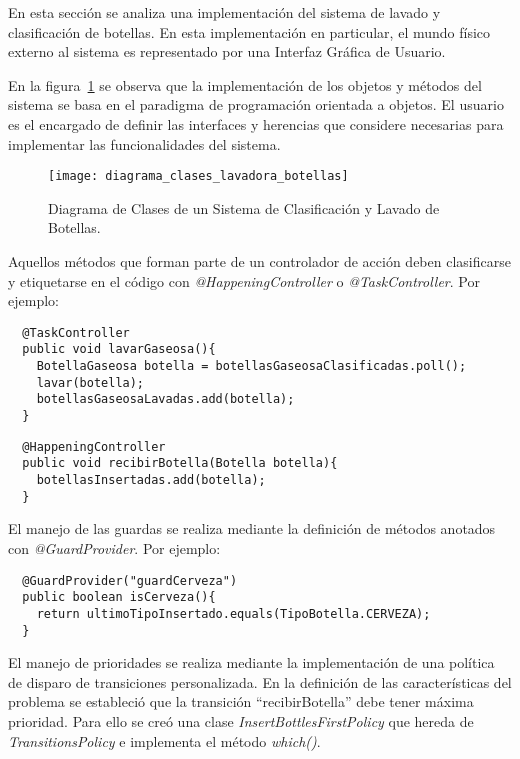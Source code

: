 En esta sección se analiza una implementación del sistema de
lavado y clasificación de botellas. En esta implementación en particular, el
mundo físico externo al sistema es representado por una Interfaz Gráfica de
Usuario. 

En la figura~\ref{fig:diagrama_clases_lavadora_botellas} se observa que la
implementación de los objetos y métodos del sistema se basa en el paradigma de
programación orientada a objetos. El usuario es el encargado de definir las
interfaces y herencias que considere necesarias para implementar las
funcionalidades del sistema.
\begin{figure}[H]
    \centering
    \texttt{[image: diagrama\_clases\_lavadora\_botellas]}
    \caption{Diagrama de Clases de un Sistema de Clasificación y Lavado de
    Botellas.}
    \label{fig:diagrama_clases_lavadora_botellas}
\end{figure}

Aquellos métodos que forman parte de un controlador de acción deben
clasificarse y etiquetarse en el código con \emph{@HappeningController} o
\emph{@TaskController}. Por ejemplo:\\

\begin{verbatim}
  @TaskController
  public void lavarGaseosa(){
    BotellaGaseosa botella = botellasGaseosaClasificadas.poll();
    lavar(botella);
    botellasGaseosaLavadas.add(botella);
  }
\end{verbatim}

\begin{verbatim}
  @HappeningController
  public void recibirBotella(Botella botella){
    botellasInsertadas.add(botella);
  }
\end{verbatim}

El manejo de las guardas se realiza mediante la definición de métodos anotados
con \emph{@GuardProvider}. Por ejemplo:\\

\begin{verbatim}
  @GuardProvider("guardCerveza")
  public boolean isCerveza(){
    return ultimoTipoInsertado.equals(TipoBotella.CERVEZA);
  }
\end{verbatim}

El manejo de prioridades se realiza mediante la implementación de una política
de disparo de transiciones personalizada. En la definición de las
características del problema se estableció que la transición ``recibirBotella''
debe tener máxima prioridad. Para ello se creó una clase
\emph{InsertBottlesFirstPolicy} que hereda de \emph{TransitionsPolicy} e
implementa el método \emph{which()}. 

